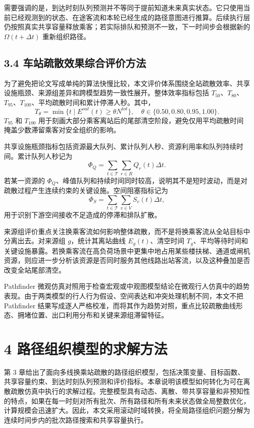 \documentclass[UTF8,a4paper,12pt]{ctexart}
\begin{document}
需要强调的是，到达时刻队列预测并不等同于提前知道未来真实状态。它只使用当前已经观测到的状态、在途客流和本轮已经生成的路径意图进行推算。后续执行层仍按照真实共享容量释放乘客；若实际排队和预测不一致，下一时间步会根据新的 \(\Omega(t+\Delta t)\) 重新组织路径。

\subsection{3.4 车站疏散效果综合评价方法}

为了避免把论文写成单纯的算法快慢比较，本文评价体系围绕全站疏散效率、共享设施瓶颈、来源组差异和跨模型趋势一致性展开。整体效率指标包括 \(T_{50}\)、\(T_{80}\)、\(T_{95}\)、\(T_{100}\)、平均疏散时间和累计停滞人秒。其中，
\[
T_{\theta}=\min\{t\mid E^{out}(t)\geq \theta N^{tot}\},\quad \theta\in\{0.50,0.80,0.95,1.00\}.
\]
\(T_{95}\) 和 \(T_{100}\) 用于刻画大部分乘客离站后的尾部清空阶段，避免仅用平均疏散时间掩盖少数滞留乘客对安全组织的影响。

共享设施瓶颈指标包括资源最大队列、累计队列人秒、资源利用率和队列持续时间。累计队列人秒记为
\[
\Phi_Q=\sum_{t\in\mathcal T}\sum_{r\in R}Q_r(t)\Delta t.
\]
若某一资源的 \(\Phi_Q\)、峰值队列和持续时间同时较高，说明其不是短时波动，而是对疏散过程产生连续约束的关键设施。空间阻塞指标记为
\[
\Phi_S=\sum_{t\in\mathcal T}\sum_{v\in V}S_v(t)\Delta t,
\]
用于识别下游空间接收不足造成的停滞和排队扩散。

来源组评价重点关注换乘客流如何影响整体疏散，而不是将换乘客流从全站目标中分离出去。对来源组 \(g\)，统计其离站曲线 \(E_g(t)\)、清空时间 \(T_g\)、平均等待时间和关键设施暴露。若换乘客流在高负荷场景中更集中地占用某些楼扶梯、通道或闸机资源，则应进一步分析该资源是否同时服务其他线路出站客流，以及这种叠加是否改变全站尾部清空。

Pathfinder 微观仿真对照用于检查宏观或中观图模型结论在微观行人仿真中的趋势表现。由于两类模型的行人行为假设、空间表达和冲突处理机制不同，本文不把 Pathfinder 结果写成逐人严格校准，而将其作为趋势对照，重点比较疏散曲线形态、拥堵位置、出口利用分布和关键来源组滞留特征。

\section{4 路径组织模型的求解方法}

第 3 章给出了面向多线换乘站疏散的路径组织模型，包括决策变量、目标函数、共享容量约束、到达时刻队列预测和评价指标。本章说明该模型如何转化为可在离散疏散仿真中执行的求解过程。完整模型具有动态、离散、带共享容量和非预知性的特点，如果在每一时刻对所有批次、所有路径和所有未来状态做全局整数优化，计算规模会迅速扩大。因此，本文采用滚动时域转换，将全局路径组织问题分解为连续时间步内的批次路径搜索和共享容量执行。
\end{document}
